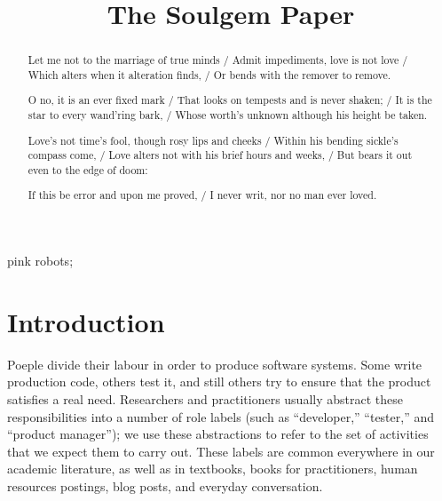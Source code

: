 \documentclass[10pt, conference, compsocconf]{IEEEtran}
\begin{document}
\title{The Soulgem Paper}

\author{
}

\maketitle


\begin{abstract}

Let me not to the marriage of true minds / Admit impediments, love is not love / Which alters when it alteration finds, / Or bends with the remover to remove.

O no, it is an ever fixed mark / That looks on tempests and is never shaken; / It is the star to every wand'ring bark, / Whose worth's unknown although his height be taken.

Love's not time's fool, though rosy lips and cheeks / Within his bending sickle's compass come, / Love alters not with his brief hours and weeks, / But bears it out even to the edge of doom:

If this be error and upon me proved, / I never writ, nor no man ever loved.
\end{abstract}

\begin{IEEEkeywords}
pink robots;
\end{IEEEkeywords}


\section{Introduction}

Poeple divide their labour in order to produce software systems. Some write production code, others test it, and still others try to ensure that the product satisfies a real need. Researchers and practitioners usually abstract these responsibilities into a number of role labels (such as ``developer,'' ``tester,'' and ``product manager''); we use these abstractions to refer to the set of activities that we expect them to carry out. These labels are common everywhere in our academic literature, as well as in textbooks, books for practitioners, human resources postings, blog posts, and everyday conversation.
\end{document}
